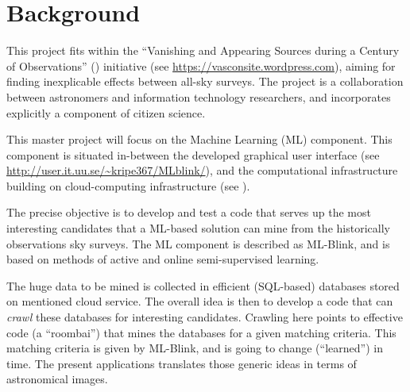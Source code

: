 \section{Background}

This project fits within the ``Vanishing and Appearing Sources during a Century of Observations'' (\vasco) initiative (see \url{https://vasconsite.wordpress.com}), aiming for finding inexplicable effects between all-sky surveys. The \vasco project is a collaboration between astronomers and information technology researchers, and incorporates explicitly a component of citizen science.

This master project will focus on the Machine Learning (ML) component. This component is situated in-between the developed graphical user interface (see \url{http://user.it.uu.se/~kripe367/MLblink/}), and the computational infrastructure building on cloud-computing infrastructure (see ).

The precise objective is to develop and test a code that serves up the most interesting candidates that a ML-based solution can mine from the historically observations sky surveys. The ML component is described as ML-Blink, and is based on methods of active and online semi-supervised learning.

The huge data to be mined is collected in efficient (SQL-based) databases stored on mentioned cloud service. The overall idea is then to develop a code that can {\em crawl} these databases for interesting candidates. Crawling here points to effective code (a ``roombai'') that mines the databases for a given matching criteria. This matching criteria is given by ML-Blink, and is going to change (``learned'') in time. The present applications translates those generic ideas in terms of astronomical images.